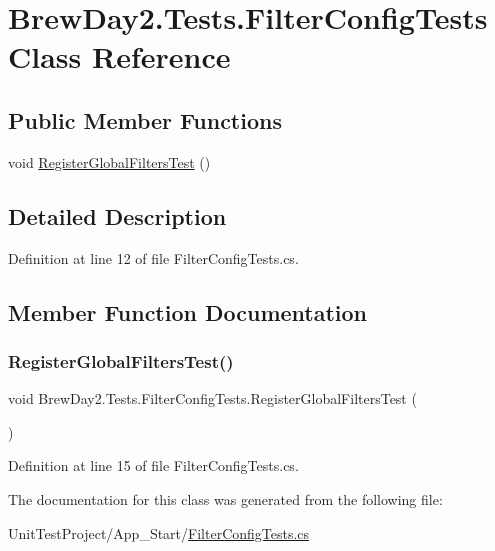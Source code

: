 \hypertarget{class_brew_day2_1_1_tests_1_1_filter_config_tests}{}\section{Brew\+Day2.\+Tests.\+Filter\+Config\+Tests Class Reference}
\label{class_brew_day2_1_1_tests_1_1_filter_config_tests}
\subsection*{Public Member Functions}
\begin{DoxyCompactItemize}
\item 
void \mbox{\hyperlink{class_brew_day2_1_1_tests_1_1_filter_config_tests_a50bff031a938f1e933b50f580283b0ae}{Register\+Global\+Filters\+Test}} ()
\end{DoxyCompactItemize}


\subsection{Detailed Description}


Definition at line 12 of file Filter\+Config\+Tests.\+cs.



\subsection{Member Function Documentation}
\mbox{\label{class_brew_day2_1_1_tests_1_1_filter_config_tests_a50bff031a938f1e933b50f580283b0ae}} 
\subsubsection{\texorpdfstring{Register\+Global\+Filters\+Test()}{RegisterGlobalFiltersTest()}}
{\footnotesize\ttfamily void Brew\+Day2.\+Tests.\+Filter\+Config\+Tests.\+Register\+Global\+Filters\+Test (\begin{DoxyParamCaption}{ }\end{DoxyParamCaption})}



Definition at line 15 of file Filter\+Config\+Tests.\+cs.



The documentation for this class was generated from the following file\+:\begin{DoxyCompactItemize}
\item 
Unit\+Test\+Project/\+App\+\_\+\+Start/\mbox{\hyperlink{_filter_config_tests_8cs}{Filter\+Config\+Tests.\+cs}}\end{DoxyCompactItemize}
